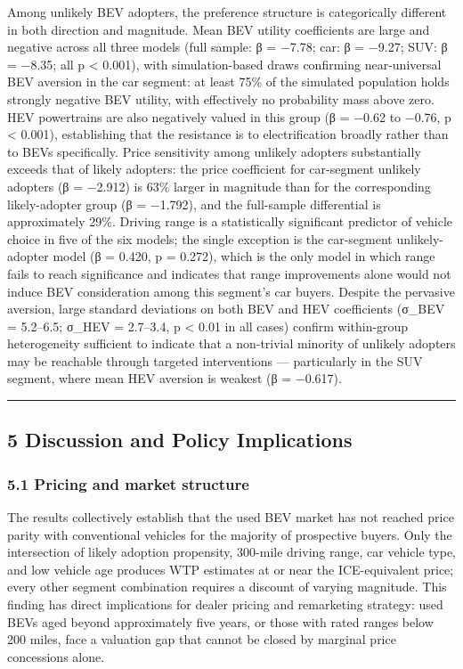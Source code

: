 \documentclass[
  letterpaper,
  DIV=11,
  numbers=noendperiod]{scrartcl}
\begin{document}
Among unlikely BEV adopters, the preference structure is categorically
different in both direction and magnitude. Mean BEV utility coefficients
are large and negative across all three models (full sample: β = −7.78;
car: β = −9.27; SUV: β = −8.35; all p \textless{} 0.001), with
simulation-based draws confirming near-universal BEV aversion in the car
segment: at least 75\% of the simulated population holds strongly
negative BEV utility, with effectively no probability mass above zero.
HEV powertrains are also negatively valued in this group (β = −0.62 to
−0.76, p \textless{} 0.001), establishing that the resistance is to
electrification broadly rather than to BEVs specifically. Price
sensitivity among unlikely adopters substantially exceeds that of likely
adopters: the price coefficient for car-segment unlikely adopters (β =
−2.912) is 63\% larger in magnitude than for the corresponding
likely-adopter group (β = −1.792), and the full-sample differential is
approximately 29\%. Driving range is a statistically significant
predictor of vehicle choice in five of the six models; the single
exception is the car-segment unlikely-adopter model (β = 0.420, p =
0.272), which is the only model in which range fails to reach
significance and indicates that range improvements alone would not
induce BEV consideration among this segment's car buyers. Despite the
pervasive aversion, large standard deviations on both BEV and HEV
coefficients (\textbar σ\_BEV\textbar{} = 5.2--6.5;
\textbar σ\_HEV\textbar{} = 2.7--3.4, p \textless{} 0.01 in all cases)
confirm within-group heterogeneity sufficient to indicate that a
non-trivial minority of unlikely adopters may be reachable through
targeted interventions --- particularly in the SUV segment, where mean
HEV aversion is weakest (β = −0.617).

\begin{center}\rule{0.5\linewidth}{0.5pt}\end{center}

\subsection{5 Discussion and Policy
Implications}\label{discussion-and-policy-implications}

\subsubsection{5.1 Pricing and market
structure}\label{pricing-and-market-structure}

The results collectively establish that the used BEV market has not
reached price parity with conventional vehicles for the majority of
prospective buyers. Only the intersection of likely adoption propensity,
300-mile driving range, car vehicle type, and low vehicle age produces
WTP estimates at or near the ICE-equivalent price; every other segment
combination requires a discount of varying magnitude. This finding has
direct implications for dealer pricing and remarketing strategy: used
BEVs aged beyond approximately five years, or those with rated ranges
below 200 miles, face a valuation gap that cannot be closed by marginal
price concessions alone.
\end{document}
